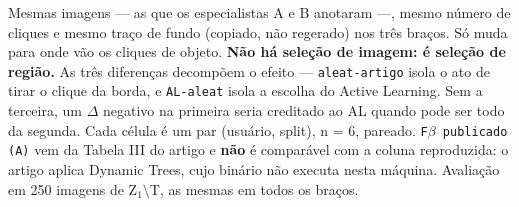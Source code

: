 \footnotesize Mesmas imagens --- as que os especialistas A e B anotaram ---, mesmo número de cliques e mesmo traço de fundo (copiado, não regerado) nos três braços. Só muda para onde vão os cliques de objeto. \textbf{Não há seleção de imagem: é seleção de região.} As três diferenças decompõem o efeito --- \texttt{aleat-artigo} isola o ato de tirar o clique da borda, e \texttt{AL-aleat} isola a escolha do Active Learning. Sem a terceira, um $\Delta$ negativo na primeira seria creditado ao AL quando pode ser todo da segunda. Cada célula é um par (usuário, split), n = 6, pareado. \texttt{F$\beta$ publicado (A)} vem da Tabela III do artigo e \textbf{não} é comparável com a coluna reproduzida: o artigo aplica Dynamic Trees, cujo binário não executa nesta máquina. Avaliação em 250 imagens de Z$_1$$\setminus$T, as mesmas em todos os braços.
\normalsize
